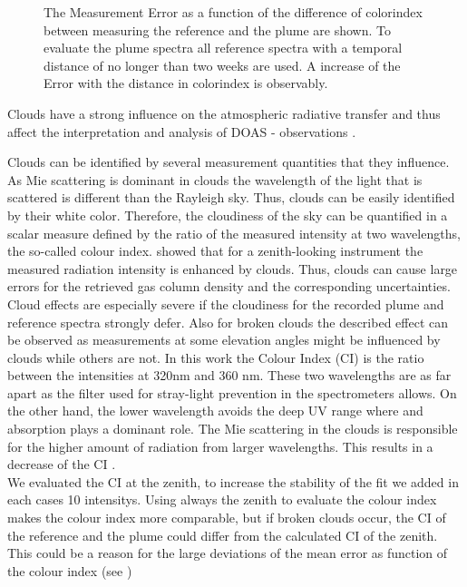 \documentclass  [
  paper    = a4,
  BCOR     = 10mm,
  twoside,
  fontsize = 12pt,
  fleqn,
  toc      = bibnumbered,
  toc      = listofnumbered,
  numbers  = noendperiod,
  headings = normal,
  listof   = leveldown,
  version  = 3.03
]                                       {scrreprt}
\begin{document}
\begin{figure}
		\caption{The   Measurement Error as a function of the difference of colorindex between measuring the reference and the plume are shown. To evaluate the plume spectra all reference spectra with a temporal distance of no longer than two weeks are used. A increase of the   Error with the distance in colorindex is observably.}
		\label{fig:diffcolidx}
	\end{figure}

	Clouds  have  a  strong  influence  on  the  atmospheric  radiative  transfer  and  thus  affect  the  interpretation  and  analysis of DOAS - observations \citep{wagner2014cloud}.
	
	Clouds can be identified by several measurement quantities that they influence.
	As Mie scattering is dominant in clouds the wavelength of the light that is scattered is different than the Rayleigh sky. Thus, clouds can be easily identified by their white color.
	Therefore, the cloudiness of the sky can be quantified in a scalar measure defined by the ratio of the measured intensity at two wavelengths, the so-called colour index.
	\cite{wagner2014cloud} showed that for a zenith-looking instrument the measured radiation intensity is enhanced by clouds. Thus, clouds can cause large errors for the retrieved gas column density and the corresponding uncertainties. 
	Cloud effects are especially severe if the cloudiness for the recorded plume and reference spectra strongly defer. Also for broken clouds the described effect can be observed as measurements at some elevation angles might be influenced by clouds while others are not.
	In this work the Colour Index (CI) is the ratio between the intensities at 320nm and 360 nm.
	These two wavelengths are as far apart as the filter used for stray-light prevention in the spectrometers allows.
	On the other hand, the lower wavelength avoids the deep UV range where  and   absorption plays a dominant role.
	The Mie scattering in the clouds is responsible for the higher amount of radiation from larger wavelengths. This results in a decrease of the CI \citep{lubcke2014optical}.
	\\
	We evaluated the CI at the zenith, to increase the stability of the fit we added in each cases 10 intensitys. Using always the zenith to evaluate the colour index makes the colour index more comparable, but if broken clouds occur, the CI of the reference and the plume could differ from the calculated CI of the zenith. This could be a reason for the large deviations of the mean  error as function of the colour index (see )
\end{document}

